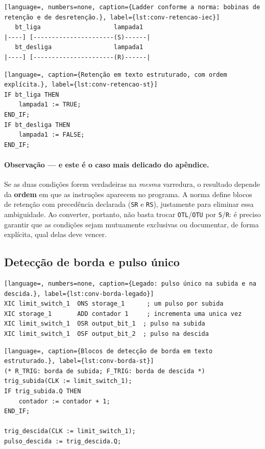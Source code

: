 \begin{lstlisting}[language=, numbers=none, caption={Ladder conforme a norma: bobinas de retenção e de desretenção.}, label={lst:conv-retencao-iec}]
   bt_liga                    lampada1
|----] [----------------------(S)------|
   bt_desliga                 lampada1
|----] [----------------------(R)------|
\end{lstlisting}

\begin{lstlisting}[language=, caption={Retenção em texto estruturado, com ordem explícita.}, label={lst:conv-retencao-st}]
IF bt_liga THEN
    lampada1 := TRUE;
END_IF;
IF bt_desliga THEN
    lampada1 := FALSE;
END_IF;
\end{lstlisting}

\paragraph{Observação --- e este é o caso mais delicado do apêndice.} Se as duas condições forem
verdadeiras na \emph{mesma} varredura, o resultado depende da \textbf{ordem} em que as instruções
aparecem no programa. A norma define blocos de retenção com precedência declarada (\texttt{SR} e
\texttt{RS}), justamente para eliminar essa ambiguidade. Ao converter, portanto, não basta trocar
\texttt{OTL}/\texttt{OTU} por \texttt{S}/\texttt{R}: é preciso garantir que as condições sejam
mutuamente exclusivas ou documentar, de forma explícita, qual delas deve vencer.

\subsection{Detecção de borda e pulso único}

\begin{lstlisting}[language=, numbers=none, caption={Legado: pulso único na subida e na descida.}, label={lst:conv-borda-legado}]
XIC limit_switch_1  ONS storage_1      ; um pulso por subida
XIC storage_1       ADD contador 1     ; incrementa uma unica vez
XIC limit_switch_1  OSR output_bit_1  ; pulso na subida
XIC limit_switch_1  OSF output_bit_2  ; pulso na descida
\end{lstlisting}

\begin{lstlisting}[language=, caption={Blocos de detecção de borda em texto estruturado.}, label={lst:conv-borda-st}]
(* R_TRIG: borda de subida; F_TRIG: borda de descida *)
trig_subida(CLK := limit_switch_1);
IF trig_subida.Q THEN
    contador := contador + 1;
END_IF;

trig_descida(CLK := limit_switch_1);
pulso_descida := trig_descida.Q;
\end{lstlisting}


